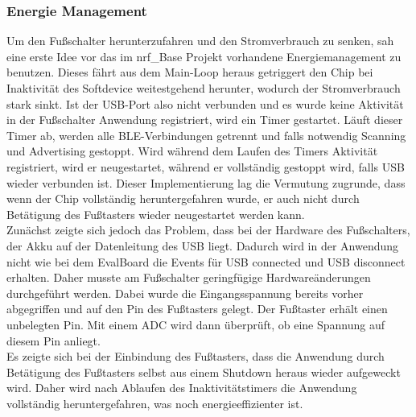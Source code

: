 \subsubsection{Energie Management}
Um den Fußschalter herunterzufahren und den Stromverbrauch zu senken, sah eine erste Idee vor das im nrf\_Base Projekt vorhandene Energiemanagement zu benutzen. Dieses fährt aus dem Main-Loop heraus getriggert den Chip bei Inaktivität des Softdevice weitestgehend herunter, wodurch der Stromverbrauch stark sinkt. Ist der \ac{USB}-Port also nicht verbunden und es wurde keine Aktivität in der Fußschalter Anwendung registriert, wird ein Timer gestartet. Läuft dieser Timer ab, werden alle \ac{BLE}-Verbindungen getrennt und falls notwendig Scanning und Advertising gestoppt. Wird während dem Laufen des Timers Aktivität registriert, wird er neugestartet, während er vollständig gestoppt wird, falls \ac{USB} wieder verbunden ist. Dieser Implementierung lag die Vermutung zugrunde, dass wenn der Chip vollständig heruntergefahren wurde, er auch nicht durch Betätigung des Fußtasters wieder neugestartet werden kann.\\
Zunächst zeigte sich jedoch das Problem, dass bei der Hardware des Fußschalters, der Akku auf der Datenleitung des \ac{USB} liegt. Dadurch wird in der Anwendung nicht wie bei dem EvalBoard die Events für \ac{USB} connected und \ac{USB} disconnect erhalten. Daher musste am Fußschalter geringfügige Hardwareänderungen durchgeführt werden. Dabei wurde die Eingangsspannung bereits vorher abgegriffen und auf den Pin des Fußtasters gelegt. Der Fußtaster erhält einen unbelegten Pin. Mit einem \ac{ADC} wird dann überprüft, ob eine Spannung auf diesem Pin anliegt.\\
Es zeigte sich bei der Einbindung des Fußtasters, dass die Anwendung durch Betätigung des Fußtasters selbst aus einem Shutdown heraus wieder aufgeweckt wird. Daher wird nach Ablaufen des Inaktivitätstimers die Anwendung vollständig heruntergefahren, was noch energieeffizienter ist.

